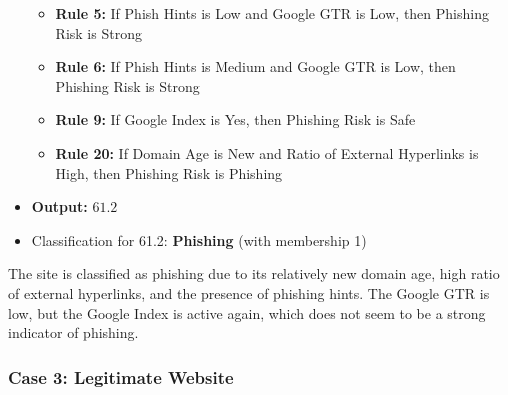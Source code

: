 \documentclass[11pt]{article}
\begin{document}
\begin{itemize}
    \begin{itemize}
        \item \textbf{Rule 5:} If Phish Hints is Low and Google GTR is Low, then Phishing Risk is Strong
        \item \textbf{Rule 6:} If Phish Hints is Medium and Google GTR is Low, then Phishing Risk is Strong
        \item \textbf{Rule 9:} If Google Index is Yes, then Phishing Risk is Safe
        \item \textbf{Rule 20:} If Domain Age is New and Ratio of External Hyperlinks is High, then Phishing Risk is Phishing
    \end{itemize}
    \item \textbf{Output:} $61.2$
    \item Classification for 61.2: \textbf{Phishing} (with membership 1)
\end{itemize}

The site is classified as phishing due to its relatively new domain age, high ratio of external hyperlinks, and the presence of phishing hints. The Google GTR is low, but the Google Index is active again, which does not seem to be a strong indicator of phishing.

\subsubsection{Case 3: Legitimate Website}
\end{document}
